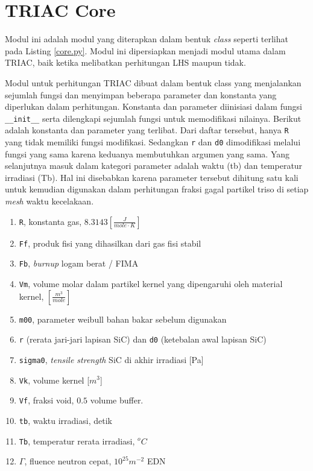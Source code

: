 \documentclass[a4paper,11pt]{report}
\begin{document}
\section{TRIAC Core}
Modul ini adalah modul yang diterapkan dalam bentuk \textit{class} seperti terlihat pada Listing \ref{core.py}. Modul ini dipersiapkan menjadi modul utama dalam TRIAC, baik ketika melibatkan perhitungan LHS maupun tidak.

Modul untuk perhitungan TRIAC dibuat dalam bentuk class yang menjalankan sejumlah fungsi dan menyimpan beberapa parameter dan konstanta yang diperlukan dalam perhitungan. Konstanta dan parameter diinisiasi dalam fungsi \texttt{\_\_init\_\_} serta dilengkapi sejumlah fungsi untuk memodifikasi nilainya. Berikut adalah konstanta dan parameter yang terlibat. Dari daftar tersebut, hanya \texttt{R} yang tidak memiliki fungsi modifikasi. Sedangkan \texttt{r} dan \texttt{d0} dimodifikasi melalui fungsi yang sama karena keduanya membutuhkan argumen yang sama. Yang selanjutnya masuk dalam kategori parameter adalah waktu (tb) dan temperatur irradiasi (Tb). Hal ini disebabkan karena parameter tersebut dihitung satu kali untuk kemudian digunakan dalam perhitungan fraksi gagal partikel triso di setiap \textit{mesh} waktu kecelakaan.
\begin{enumerate}
   \item \texttt{R}, konstanta gas, $8.3143 \left[\frac{J}{mole \cdot K}\right]$
   \item \texttt{Ff}, produk fisi yang dihasilkan dari gas fisi stabil
   \item \texttt{Fb}, \textit{burnup} logam berat / FIMA
   \item \texttt{Vm}, volume molar dalam partikel kernel yang dipengaruhi oleh material kernel,  $\left[\frac{m^3}{mole} \right]$
   \item \texttt{m00}, parameter weibull bahan bakar sebelum digunakan
   \item \texttt{r} (rerata jari-jari lapisan SiC) dan \texttt{d0} (ketebalan awal lapisan SiC)
   \item \texttt{sigma0}, \textit{tensile strength} SiC di akhir irradiasi [Pa]
   \item \texttt{Vk}, volume kernel [$m^3$]
   \item \texttt{Vf}, fraksi void, $0.5$ volume buffer.
   \item \texttt{tb}, waktu irradiasi, detik
   \item \texttt{Tb}, temperatur rerata irradiasi, $^{o}C$
   \item $\Gamma$, fluence neutron cepat, $10^{25} m^{-2} $ EDN
 \end{enumerate} 
\end{document}
